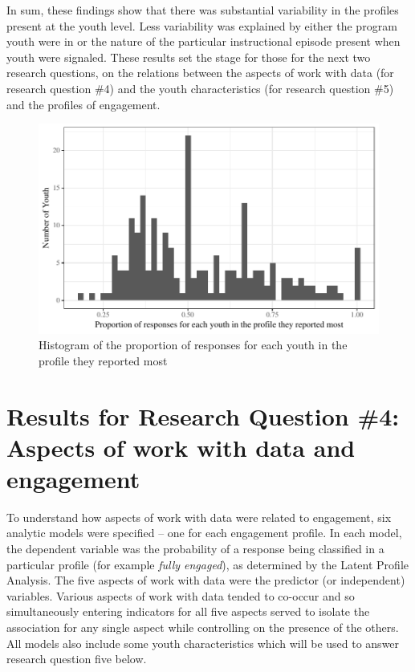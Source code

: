 \documentclass[]{msu-thesis}
\theoremstyle{definition}
\theoremstyle{definition}
\theoremstyle{definition}
\theoremstyle{remark}
\begin{document}
In sum, these findings show that there was substantial variability in
the profiles present at the youth level. Less variability was explained
by either the program youth were in or the nature of the particular
instructional episode present when youth were signaled. These results
set the stage for those for the next two research questions, on the
relations between the aspects of work with data (for research question
\#4) and the youth characteristics (for research question \#5) and the
profiles of engagement.

\begin{figure}

{\centering \includegraphics[width=0.8\linewidth]{rosenberg-dissertation_files/figure-latex/unnamed-chunk-15-1}

}

\caption{Histogram of the proportion of responses for each youth in the profile they reported most}\label{fig:unnamed-chunk-15}
\end{figure}

\section{Results for Research Question \#4: Aspects of work with data
and
engagement}\label{results-for-research-question-4-aspects-of-work-with-data-and-engagement}

To understand how aspects of work with data were related to engagement,
six analytic models were specified -- one for each engagement profile.
In each model, the dependent variable was the probability of a response
being classified in a particular profile (for example \emph{fully
engaged}), as determined by the Latent Profile Analysis. The five
aspects of work with data were the predictor (or independent) variables.
Various aspects of work with data tended to co-occur and so
simultaneously entering indicators for all five aspects served to
isolate the association for any single aspect while controlling on the
presence of the others. All models also include some youth
characteristics which will be used to answer research question five
below.
\end{document}
